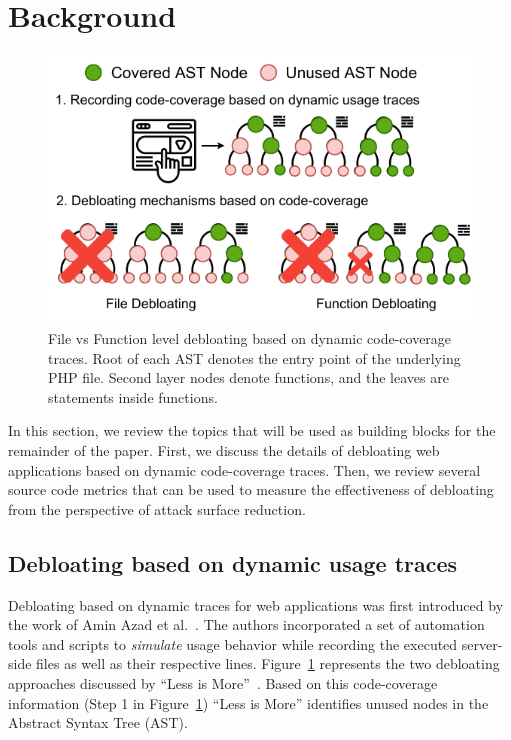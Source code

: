 \section{Background}

\begin{figure}[t]
    \centering
    \includegraphics[width=0.75\columnwidth]{figures/dbltr/file_vs_function_debloating.drawio.pdf}
    \caption{File vs Function level debloating based on dynamic code-coverage traces. Root of each AST denotes the entry point of the underlying PHP file. Second layer nodes denote functions, and the leaves are statements inside functions.}
    \label{fig:file_vs_func_debloating}
\end{figure}

In this section, we review the topics that will be used as building blocks for the remainder of the paper. 
First, we discuss the details of debloating web applications based on dynamic code-coverage traces. 
Then, we review several source code metrics that can be used to measure the effectiveness of debloating from the perspective of attack surface reduction.

\subsection{Debloating based on dynamic usage traces}
Debloating based on dynamic traces for web applications was first introduced by the work of Amin Azad et al.~\cite{lessismore}. 
The authors incorporated a set of automation tools and scripts to \emph{simulate} usage behavior while recording the executed server-side files as well as their respective lines.
Figure~\ref{fig:file_vs_func_debloating} represents the two debloating approaches discussed by ``Less is More''~\cite{lessismore}. 
Based on this code-coverage information (Step 1 in Figure~\ref{fig:file_vs_func_debloating}) ``Less is More'' identifies unused nodes in the Abstract Syntax Tree (AST). 

